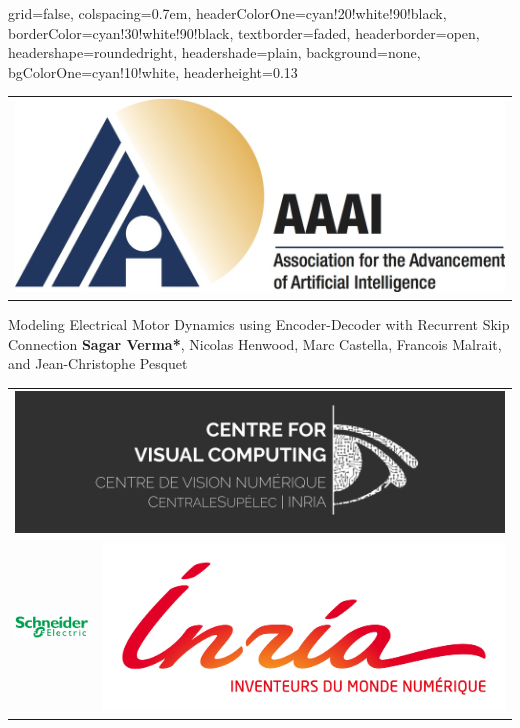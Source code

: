 \documentclass[landscape,a0paper,fontscale=0.292]{baposter}
\begin{document}
\begin{poster}{
 grid=false,
 colspacing=0.7em,
 headerColorOne=cyan!20!white!90!black,
 borderColor=cyan!30!white!90!black,
 textborder=faded,
 headerborder=open,
 headershape=roundedright,
 headershade=plain,
 background=none,
 bgColorOne=cyan!10!white,
 headerheight=0.13\textheight}
 {
   \begin{tabular}{c}
    \includegraphics[scale=0.11]{logo_aaai} \\
   \end{tabular}
 }
 {\sc\Huge Modeling Electrical Motor Dynamics using Encoder-Decoder with Recurrent Skip Connection}
  {\textbf{Sagar Verma*}, Nicolas Henwood, Marc Castella, Francois Malrait, and Jean-Christophe Pesquet \\
  }
  {
   \begin{tabular}{c c}
     \multicolumn{2}{c}{\includegraphics[scale=0.13]{logo_cvn}} \\
     \includegraphics[scale=0.37]{logo_se} &
     \includegraphics[scale=0.18]{logo_inria} \\
   \end{tabular}
  }


\end{poster}
\end{document}
